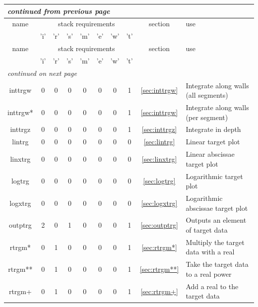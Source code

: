 \documentclass[a4paper,10pt]{report}
\begin{document}
\begin{center}
  \begin{longtable}{|c|c|c|c|c|c|c|c|c|l|}
    \hline
    \multicolumn{10}{|l|}{\small\sl continued from previous page} \\
    \hline name & \multicolumn{7}{|c|}{stack requirements} & section & use \\
    \hline   & 'i' & 'r' & 's' & 'm' & 'e' & 'w' & 't' &   &   \\
    \hline \endhead
    \hline name & \multicolumn{7}{|c|}{stack requirements} & section & use \\
    \hline   & 'i' & 'r' & 's' & 'm' & 'e' & 'w' & 't' &   &   \\
    \hline \endfirsthead
    \hline
    \multicolumn{10}{|l|}{\small\sl continued on next page} \\
    \hline \endfoot
    \endlastfoot
    inttrgw \index{b2plot, inttrgw}  & 0 & 0 & 0 & 0 & 0 & 0 & 1 & \ref{sec:inttrgw}  & Integrate along walls (all segments) \\
    inttrgw* \index{b2plot, inttrgw*} & 0 & 0 & 0 & 0 & 0 & 0 & 1 & \ref{sec:inttrgw}  & Integrate along walls (per segment) \\
    inttrgz \index{b2plot, inttrgz}  & 0 & 0 & 0 & 0 & 0 & 0 & 1 & \ref{sec:inttrgz}  & Integrate in depth \\
    lintrg \index{b2plot, lintrg}   & 0 & 0 & 0 & 0 & 0 & 0 & 0 & \ref{sec:lintrg}   & Linear target plot \\
    linxtrg \index{b2plot, linxtrg}  & 0 & 0 & 0 & 0 & 0 & 0 & 0 & \ref{sec:linxtrg}  & Linear abscissae target plot \\
    logtrg \index{b2plot, logtrg}   & 0 & 0 & 0 & 0 & 0 & 0 & 0 & \ref{sec:logtrg}   & Logarithmic target plot \\
    logxtrg \index{b2plot, logxtrg}  & 0 & 0 & 0 & 0 & 0 & 0 & 0 & \ref{sec:logxtrg}  & Logarithmic abscissae target plot \\
    outptrg \index{b2plot, outptrg}  & 2 & 0 & 1 & 0 & 0 & 0 & 1 & \ref{sec:outptrg}  & Outputs an element of target data \\
    rtrgm* \index{b2plot, rtrgm*}   & 0 & 1 & 0 & 0 & 0 & 0 & 1 & \ref{sec:rtrgm*}   & Multiply the target data with a real \\
    rtrgm** \index{b2plot, rtrgm**}  & 0 & 1 & 0 & 0 & 0 & 0 & 1 & \ref{sec:rtrgm**}  & Take the target data to a real power \\
    rtrgm+ \index{b2plot, rtrgm+}   & 0 & 1 & 0 & 0 & 0 & 0 & 1 & \ref{sec:rtrgm+}   & Add a real to the target data \\

\end{longtable}
\end{center}
\end{document}

